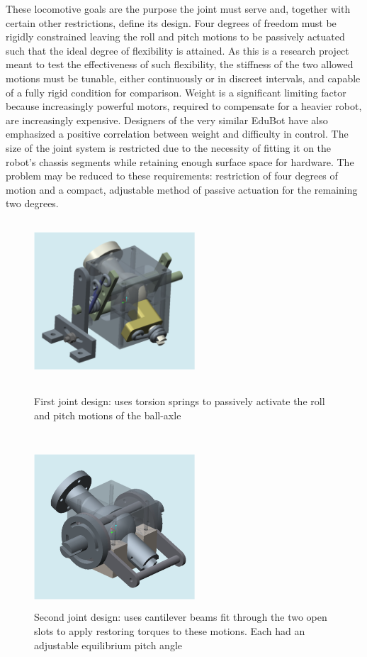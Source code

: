 \documentclass[11pt]{article}
\begin{document}
These locomotive goals are the purpose the joint must serve and, together with certain other restrictions, define its design.  Four degrees of freedom must be rigidly constrained leaving the roll and pitch motions to be passively actuated such that the ideal degree of flexibility is attained. As this is a research project meant to test the effectiveness of such flexibility, the stiffness of the two allowed motions must be tunable, either continuously or in discreet intervals, and capable of a fully rigid condition for comparison. Weight is a significant limiting factor because increasingly powerful motors, required to compensate for a heavier robot, are increasingly expensive. Designers of the very similar EduBot have also emphasized a positive correlation between weight and difficulty in control. The size of the joint system is restricted due to the necessity of fitting it on the robot's chassis segments while retaining enough surface space for hardware. The problem may be reduced to these requirements: restriction of four degrees of motion and a compact, adjustable method of passive actuation for the remaining two degrees.

\begin{figure}[t]
\begin{minipage}[b]{0.45\linewidth}
\centering
\includegraphics[width=6cm,height=6cm]{joint1.png}
\caption{First joint design: uses torsion springs to passively activate the roll and pitch motions of the ball-axle\\\\}
\label{fig:originaljoint}
\end{minipage}
\hspace{0.5cm}
\begin{minipage}[b]{0.45\linewidth}
\centering
\includegraphics[width=6cm,height=6cm]{joint2.png}
\caption{Second joint design: uses cantilever beams fit through the two open slots to apply restoring torques to these motions. Each had an adjustable equilibrium pitch angle}
\label{fig:secondjoint}
\end{minipage}
\end{figure}
\end{document}
